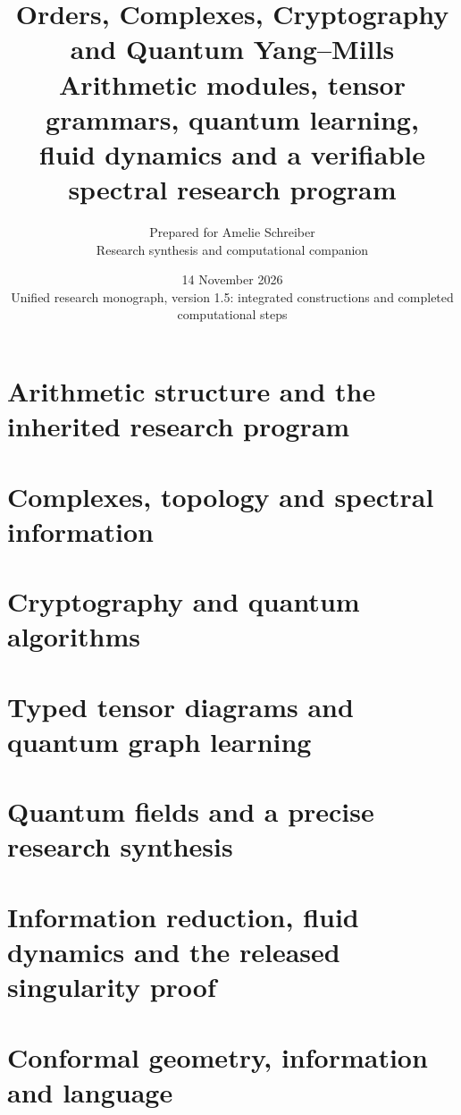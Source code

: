 \documentclass[11pt,oneside,openany]{book}
\title{\textbf{Orders, Complexes, Cryptography\\and Quantum Yang--Mills}\\[1em]\Large Arithmetic modules, tensor grammars, quantum learning,\\fluid dynamics and a verifiable spectral research program}
\author{Prepared for Amelie Schreiber\\[.4em]\normalsize Research synthesis and computational companion}
\date{14 November 2026\\\small Unified research monograph, version 1.5: integrated constructions and completed computational steps}
\theoremstyle{definition}
\theoremstyle{remark}
\begin{document}
\frontmatter
\hypersetup{pageanchor=false}
\maketitle
\clearpage
\hypersetup{pageanchor=true}

\tableofcontents
\mainmatter
\part{Arithmetic structure and the inherited research program}


\part{Complexes, topology and spectral information}



\part{Cryptography and quantum algorithms}




\part{Typed tensor diagrams and quantum graph learning}


\part{Quantum fields and a precise research synthesis}


\part{Information reduction, fluid dynamics and the released singularity proof}









\begin{center}\small\end{center}
\part{Conformal geometry, information and language}




\end{document}
